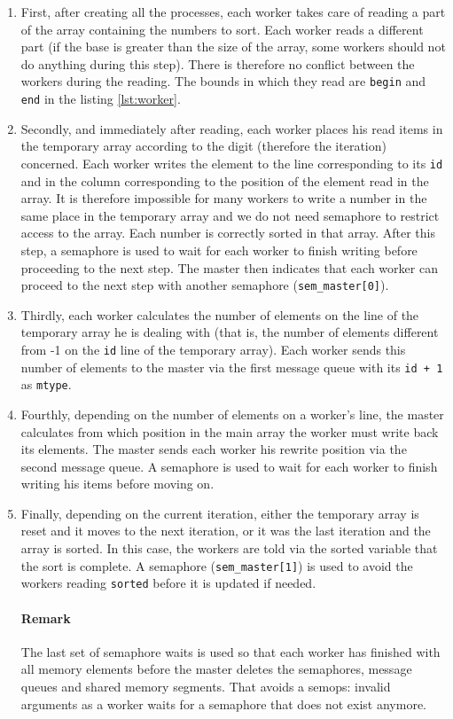 \documentclass[a4paper, 12pt]{article}
\begin{document}
	\begin{enumerate}
	    \item First, after creating all the processes, each worker takes care of reading a part of the array containing the numbers to sort. Each worker reads a different part (if the base is greater than the size of the array, some workers should not do anything during this step). There is therefore no conflict between the workers during the reading. The bounds in which they read are \texttt{begin} and \texttt{end} in the listing \ref{lst:worker}.
	    \item Secondly, and immediately after reading, each worker places his read items in the temporary array according to the digit (therefore the iteration) concerned. Each worker writes the element to the line corresponding to its \texttt{id} and in the column corresponding to the position of the element read in the array. It is therefore impossible for many workers to write a number in the same place in the temporary array and we do not need semaphore to restrict access to the array. Each number is correctly sorted in that array. After this step, a semaphore is used to wait for each worker to finish writing before proceeding to the next step. The master then indicates that each worker can proceed to the next step with another semaphore (\texttt{sem\_master[0]}).
	    \item Thirdly, each worker calculates the number of elements on the line of the temporary array he is dealing with (that is, the number of elements different from -1 on the \texttt{id} line of the temporary array). Each worker sends this number of elements to the master via the first message queue with its \texttt{id + 1} as \texttt{mtype}.
	    \item Fourthly, depending on the number of elements on a worker's line, the master calculates from which position in the main array the worker must write back its elements. The master sends each worker his rewrite position via the second message queue. A semaphore is used to wait for each worker to finish writing his items before moving on.
	    \item Finally, depending on the current iteration, either the temporary array is reset and it moves to the next iteration, or it was the last iteration and the array is sorted. In this case, the workers are told via the sorted variable that the sort is complete. A semaphore (\texttt{sem\_master[1]}) is used to avoid the workers reading \texttt{sorted} before it is updated if needed.
	    
	    \paragraph{Remark} The last set of semaphore waits is used so that each worker has finished with all memory elements before the master deletes the semaphores, message queues and shared memory segments. That avoids a \og semops: invalid arguments\fg{} as a worker waits for a semaphore that does not exist anymore.
	\end{enumerate}
	
\end{document}
